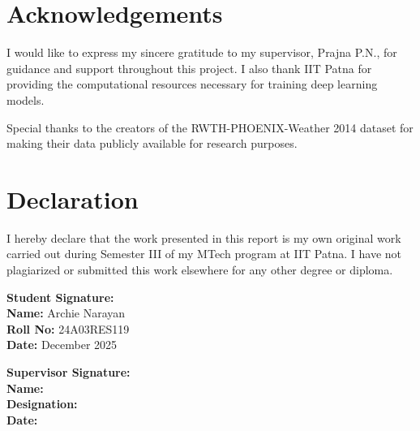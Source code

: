 \documentclass[12pt,a4paper]{article}
\begin{document}
\section*{Acknowledgements}

I would like to express my sincere gratitude to my supervisor, Prajna P.N., for guidance and support throughout this project. I also thank IIT Patna for providing the computational resources necessary for training deep learning models.

Special thanks to the creators of the RWTH-PHOENIX-Weather 2014 dataset for making their data publicly available for research purposes.

\vspace{1cm}

\section*{Declaration}

I hereby declare that the work presented in this report is my own original work carried out during Semester III of my MTech program at IIT Patna. I have not plagiarized or submitted this work elsewhere for any other degree or diploma.

\vspace{2cm}

\noindent
\begin{minipage}[t]{0.45\textwidth}
\textbf{Student Signature:} \hrulefill\\[0.5cm]
\textbf{Name:} Archie Narayan\\[0.3cm]
\textbf{Roll No:} 24A03RES119\\[0.3cm]
\textbf{Date:} December 2025
\end{minipage}
\hfill
\begin{minipage}[t]{0.45\textwidth}
\textbf{Supervisor Signature:} \hrulefill\\[0.5cm]
\textbf{Name:} \hrulefill\\[0.3cm]
\textbf{Designation:} \hrulefill\\[0.3cm]
\textbf{Date:} \hrulefill
\end{minipage}
\end{document}
